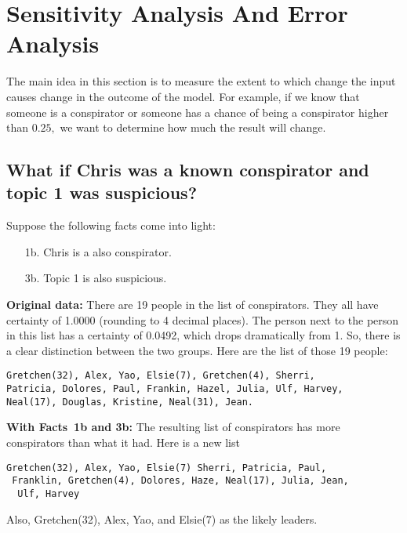 \documentclass{icmmcm}
\begin{document}

\section{Sensitivity Analysis And Error Analysis}
The main idea in this section is to measure the extent to which change the input causes change in the outcome of the model. 
For example, if we know that someone is a conspirator
or someone has a chance of being a conspirator 
higher than $0.25,$
we want to determine how much the result will change.

\subsection{What if Chris was a known conspirator and topic 1 was suspicious?}

Suppose the following facts come into light:
\begin{enumerate}
\item[1b.] Chris is a also conspirator.
\item[3b.] Topic 1 is also suspicious.
\end{enumerate}

\textbf{Original data:}
There are 19 people in the list of conspirators.
They all have certainty of 1.0000 (rounding to 4 decimal places). The person next to the person in this list has
a certainty of 0.0492, which drops dramatically from 1.
So, there is a clear distinction between the two groups.
Here are the list of those 19 people:
\begin{verbatim}
Gretchen(32), Alex, Yao, Elsie(7), Gretchen(4), Sherri,
Patricia, Dolores, Paul, Frankin, Hazel, Julia, Ulf, Harvey,
Neal(17), Douglas, Kristine, Neal(31), Jean.
\end{verbatim}

\textbf{With Facts~1b and 3b:}
The resulting list of conspirators has more conspirators than what it had. Here is a new list
\begin{verbatim}
Gretchen(32), Alex, Yao, Elsie(7) Sherri, Patricia, Paul,
 Franklin, Gretchen(4), Dolores, Haze, Neal(17), Julia, Jean,
  Ulf, Harvey 
\end{verbatim} 
 Also, Gretchen(32), Alex, Yao, and Elsie(7) as the likely leaders.
\end{document}
